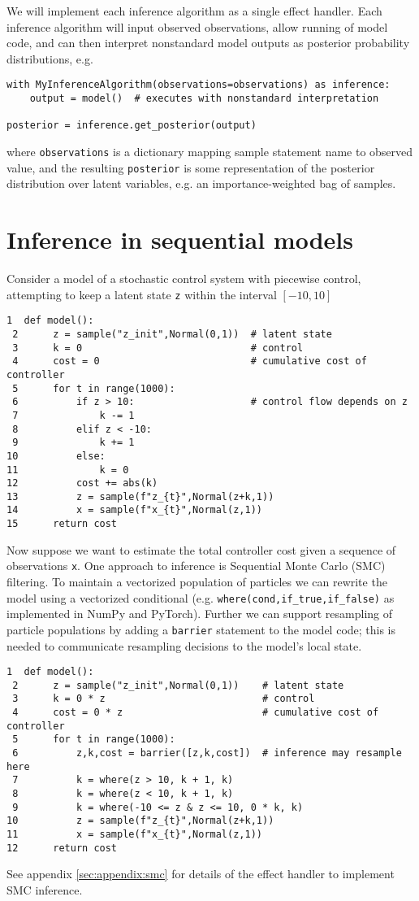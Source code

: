 \documentclass[anonymous=false, %
               format=acmsmall, %
               review=true, %
               screen=true, %
               nonacm=true]{acmart}
\begin{document}
We will implement each inference algorithm as a single effect handler.
Each inference algorithm will input observed observations, allow running of model code, and can then interpret nonstandard model outputs as posterior probability distributions, e.g.
\begin{Verbatim}[samepage=true]
with MyInferenceAlgorithm(observations=observations) as inference:
    output = model()  # executes with nonstandard interpretation

posterior = inference.get_posterior(output)
\end{Verbatim}
where \verb$observations$ is a dictionary mapping sample statement name to observed value, and the resulting \verb$posterior$ is some representation of the posterior distribution over latent variables, e.g. an importance-weighted bag of samples.

\section{Inference in sequential models}

Consider a model of a stochastic control system with piecewise control, attempting to keep a latent state \verb$z$ within the interval $[-10,10]$
\begin{Verbatim}[samepage=true]
 1  def model():
 2      z = sample("z_init",Normal(0,1))  # latent state
 3      k = 0                             # control
 4      cost = 0                          # cumulative cost of controller
 5      for t in range(1000):
 6          if z > 10:                    # control flow depends on z
 7              k -= 1
 8          elif z < -10:
 9              k += 1
10          else:
11              k = 0
12          cost += abs(k)
13          z = sample(f"z_{t}",Normal(z+k,1))
14          x = sample(f"x_{t}",Normal(z,1))
15      return cost
\end{Verbatim}
Now suppose we want to estimate the total controller cost given a sequence of observations \verb$x$.
One approach to inference is Sequential Monte Carlo (SMC) filtering.
To maintain a vectorized population of particles we can rewrite the model using a vectorized conditional (e.g. \verb$where(cond,if_true,if_false)$ as implemented in NumPy and PyTorch).
Further we can support resampling of particle populations by adding a \verb$barrier$ statement to the model code; this is needed to communicate resampling decisions to the model's local state.
\begin{Verbatim}[samepage=true]
 1  def model():
 2      z = sample("z_init",Normal(0,1))    # latent state
 3      k = 0 * z                           # control
 4      cost = 0 * z                        # cumulative cost of controller
 5      for t in range(1000):
 6          z,k,cost = barrier([z,k,cost])  # inference may resample here
 7          k = where(z > 10, k + 1, k)
 8          k = where(z < 10, k + 1, k)
 9          k = where(-10 <= z & z <= 10, 0 * k, k)
10          z = sample(f"z_{t}",Normal(z+k,1))
11          x = sample(f"x_{t}",Normal(z,1))
12      return cost
\end{Verbatim}
See appendix \ref{sec:appendix:smc} for details of the effect handler to implement SMC inference.
\end{document}
